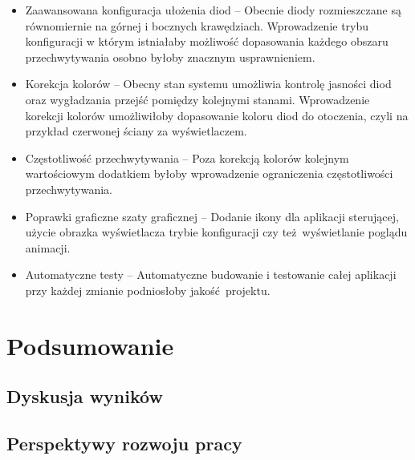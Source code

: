 \documentclass[12pt]{report}
\begin{document}
\begin{itemize}
	\item Zaawansowana konfiguracja ułożenia diod -- Obecnie diody rozmieszczane są równomiernie na górnej i bocznych krawędziach. Wprowadzenie trybu konfiguracji w którym istniałaby możliwość dopasowania każdego obszaru przechwytywania osobno byłoby znacznym usprawnieniem.
	\item Korekcja kolorów -- Obecny stan systemu umożliwia kontrolę jasności diod oraz wygładzania przejść pomiędzy kolejnymi stanami. Wprowadzenie korekcji kolorów umożliwiłoby dopasowanie koloru diod do otoczenia, czyli na przykład czerwonej ściany za wyświetlaczem.
	\item Częstotliwość przechwytywania -- Poza korekcją kolorów kolejnym wartościowym dodatkiem byłoby wprowadzenie ograniczenia częstotliwości przechwytywania.
	\item Poprawki graficzne szaty graficznej -- Dodanie ikony dla aplikacji sterującej, użycie obrazka wyświetlacza trybie konfiguracji czy też wyświetlanie poglądu animacji.
	\item Automatyczne testy -- Automatyczne budowanie i testowanie całej aplikacji przy każdej zmianie podniosłoby jakość projektu. 
\end{itemize}

\chapter{Podsumowanie}

\section{Dyskusja wyników}


\section{Perspektywy rozwoju pracy}

\end{document}
